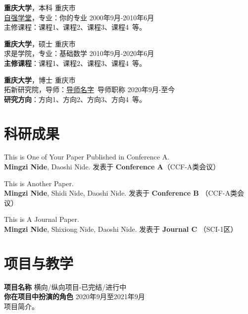     {\large \textbf{重庆大学}}，本科 \hfill {重庆市} \\
    \href{学院官网.whu.edu.cn}{\underline{自强学堂}}，专业：你的专业 \hfill {2000年9月-2010年6月} \\
    {主修课程}：课程1、课程2、课程3、课程4\ 等。

    \vspace{0.5em}
    {\large \textbf{重庆大学}}，硕士 \hfill {重庆市} \\
    {{求是学院}}，专业：基础数学 \hfill {2010年9月-2020年6月} \\
    \textbf{主修课程}：课程1、课程2、课程3、课程4\ 等。

    \vspace{0.5em}
    {\large \textbf{重庆大学}}，博士 \hfill {重庆市} \\
    {{拓新研究院}}，导师：\href{导师的个人主页.site}{导师名字}\ 导师职称 \hfill {2020年9月-至今} \\
    \textbf{研究方向}：方向1、方向2、方向3、方向4\ 等。

    \section{\makebox[\widthof{\faGraduationCap}][c]{\color{CQU_Blue}{\faGraduationCap}}\quad 科研成果}


    This is One of Your Paper Published in Conference A. \\
    \textbf{Mingzi Nide}, Daoshi Nide. \hfill 
    发表于 \textbf{Conference A}（CCF-A类会议） 

    \vspace{0.5em}
    This is Another Paper. \\
    \textbf{Mingzi Nide}, Shidi Nide, Daoshi Nide. \hfill 
    发表于 \textbf{Conference B} （CCF-A类会议）

    \vspace{0.5em}
    This is A Journal Paper.\\
    \textbf{Mingzi Nide}, Shixiong Nide, Daoshi Nide. \hfill 
    发表于 \textbf{Journal C} （SCI-1区）

    \section{\makebox[\widthof{\faChalkboardTeacher}][c]{\color{CQU_Blue}{\faChalkboardTeacher}}\quad 项目与教学}
    \vspace{0.5em}
    {\large{\textbf{项目名称}}} \hfill {横向/纵向项目-已完结/进行中}\\
    \textbf{你在项目中扮演的角色} \hfill 2020年9月至2021年9月\\
    项目简介。

